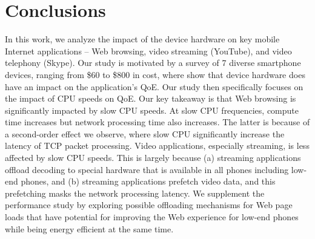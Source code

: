 
\section{Conclusions}

In this work, we analyze the impact of the device hardware on key mobile Internet applications -- Web browsing, video streaming (YouTube), and video telephony (Skype). Our study is motivated by a survey of 7 diverse smartphone devices, ranging from \$60 to \$800 in cost, where show that device hardware does have an impact on 
the application's QoE. Our study then
specifically focuses on the impact of CPU speeds on QoE. Our key takeaway is that Web browsing is significantly impacted by slow CPU speeds. At slow CPU frequencies, compute time increases but  network processing time also increases. The latter is because of a second-order effect we observe, where slow CPU significantly increase the latency of TCP packet processing. Video applications, especially streaming, is less affected by slow CPU speeds. This is largely because (a) streaming applications offload decoding to special hardware that is available in all phones including low-end phones, and (b) streaming applications prefetch video data, and this prefetching masks the network processing latency. We supplement the performance study by exploring
possible offloading mechanisms for Web page loads that 
have potential for improving the Web experience for low-end phones while being
energy efficient at the same time. 


%
%
